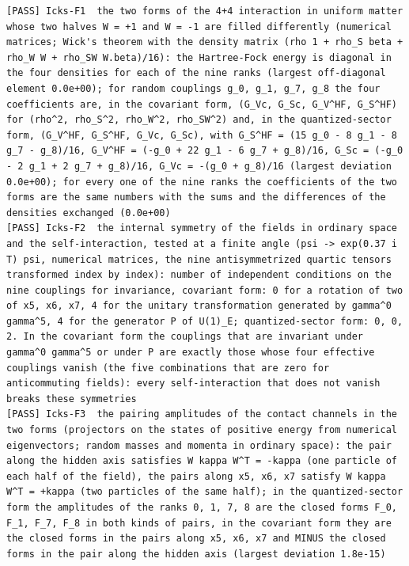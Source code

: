 \documentclass[
  10pt,
]{article}
\begin{document}
\begin{verbatim}
[PASS] Icks-F1  the two forms of the 4+4 interaction in uniform matter whose two halves W = +1 and W = -1 are filled differently (numerical matrices; Wick's theorem with the density matrix (rho 1 + rho_S beta + rho_W W + rho_SW W.beta)/16): the Hartree-Fock energy is diagonal in the four densities for each of the nine ranks (largest off-diagonal element 0.0e+00); for random couplings g_0, g_1, g_7, g_8 the four coefficients are, in the covariant form, (G_Vc, G_Sc, G_V^HF, G_S^HF) for (rho^2, rho_S^2, rho_W^2, rho_SW^2) and, in the quantized-sector form, (G_V^HF, G_S^HF, G_Vc, G_Sc), with G_S^HF = (15 g_0 - 8 g_1 - 8 g_7 - g_8)/16, G_V^HF = (-g_0 + 22 g_1 - 6 g_7 + g_8)/16, G_Sc = (-g_0 - 2 g_1 + 2 g_7 + g_8)/16, G_Vc = -(g_0 + g_8)/16 (largest deviation 0.0e+00); for every one of the nine ranks the coefficients of the two forms are the same numbers with the sums and the differences of the densities exchanged (0.0e+00)
[PASS] Icks-F2  the internal symmetry of the fields in ordinary space and the self-interaction, tested at a finite angle (psi -> exp(0.37 i T) psi, numerical matrices, the nine antisymmetrized quartic tensors transformed index by index): number of independent conditions on the nine couplings for invariance, covariant form: 0 for a rotation of two of x5, x6, x7, 4 for the unitary transformation generated by gamma^0 gamma^5, 4 for the generator P of U(1)_E; quantized-sector form: 0, 0, 2. In the covariant form the couplings that are invariant under gamma^0 gamma^5 or under P are exactly those whose four effective couplings vanish (the five combinations that are zero for anticommuting fields): every self-interaction that does not vanish breaks these symmetries
[PASS] Icks-F3  the pairing amplitudes of the contact channels in the two forms (projectors on the states of positive energy from numerical eigenvectors; random masses and momenta in ordinary space): the pair along the hidden axis satisfies W kappa W^T = -kappa (one particle of each half of the field), the pairs along x5, x6, x7 satisfy W kappa W^T = +kappa (two particles of the same half); in the quantized-sector form the amplitudes of the ranks 0, 1, 7, 8 are the closed forms F_0, F_1, F_7, F_8 in both kinds of pairs, in the covariant form they are the closed forms in the pairs along x5, x6, x7 and MINUS the closed forms in the pair along the hidden axis (largest deviation 1.8e-15)

\end{verbatim}
\end{document}
